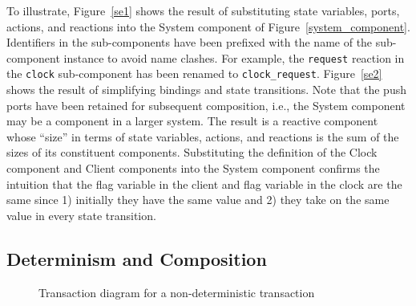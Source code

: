To illustrate, Figure~\ref{se1} shows the result of substituting state variables, ports, actions, and reactions into the System component of Figure~\ref{system_component}.
Identifiers in the sub-components have been prefixed with the name of the sub-component instance to avoid name clashes.
For example, the \verb+request+ reaction in the \verb+clock+ sub-component has been renamed to \verb+clock_request+.
Figure~\ref{se2} shows the result of simplifying bindings and state transitions.
Note that the push ports have been retained for subsequent composition, i.e., the System component may be a component in a larger system.
The result is a reactive component whose ``size'' in terms of state variables, actions, and reactions is the sum of the sizes  of its constituent components.
Substituting the definition of the Clock component and Client components into the System component confirms the intuition that the flag variable in the client and flag variable in the clock are the same since 1) initially they have the same value and 2) they take on the same value in every state transition.

\subsection{Determinism and Composition}
\label{determinism}

\begin{figure}
\centering
\begingroup
\fontsize{10pt}{12pt}\selectfont
{}
\endgroup
\caption{Transaction diagram for a non-deterministic transaction}
\label{ndt}
\end{figure}

